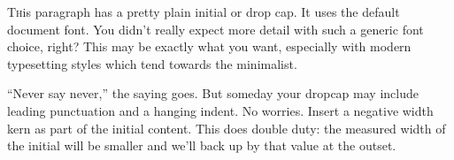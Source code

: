 \documentclass{article}
\begin{document}
\lettrine{T}his paragraph has a pretty plain initial or drop cap.
It uses the default document font.
You didn’t really expect more detail with such a generic font choice, right?
This may be exactly what you want, especially with modern typesetting styles which tend towards the minimalist.

“Never say never,” the saying goes.
But someday your dropcap may include leading punctuation {and} a hanging indent.
No worries.
Insert a negative width kern as part of the initial content.
This does double duty: the measured width of the initial will be smaller and we'll back up by that value at the outset.
\end{document}
